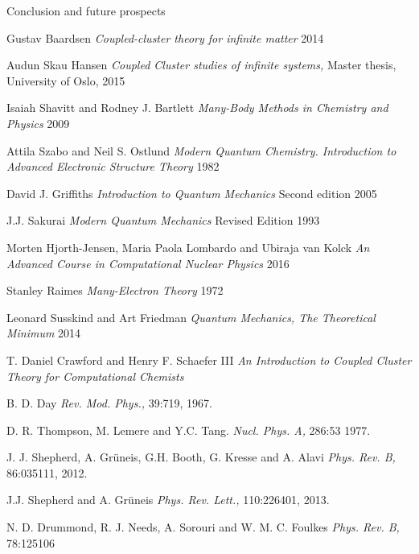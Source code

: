 \documentclass[twoside,english]{uiofysmaster}
\begin{document}
\begin{chapter}{Conclusion and future prospects}
	
\end{chapter}


\medskip


\begin{thebibliography}{9}

	Gustav Baardsen
	\textit{Coupled-cluster theory for infinite matter} 2014

	Audun Skau Hansen
	\textit{Coupled Cluster studies of infinite systems,} Master thesis, University of Oslo, 2015

	Isaiah Shavitt and Rodney J. Bartlett
	\textit{Many-Body Methods in Chemistry and Physics} 2009

	Attila Szabo and Neil S. Ostlund
	\textit{Modern Quantum Chemistry. Introduction to Advanced Electronic Structure Theory} 1982

	David J. Griffiths
	\textit{Introduction to Quantum Mechanics} Second edition 2005

	J.J. Sakurai
	\textit{Modern Quantum Mechanics} Revised Edition 1993

	Morten Hjorth-Jensen, Maria Paola Lombardo and Ubiraja van Kolck
	\textit{An Advanced Course in Computational Nuclear Physics} 2016

	Stanley Raimes
	\textit{Many-Electron Theory} 1972

	Leonard Susskind and Art Friedman
	\textit{Quantum Mechanics, The Theoretical Minimum} 2014

	T. Daniel Crawford and Henry F. Schaefer III
	\textit{An Introduction to Coupled Cluster Theory for Computational Chemists} 

	B. D. Day
	\textit{Rev. Mod. Phys.,}
	39:719, 1967.

	D. R. Thompson, M. Lemere and Y.C. Tang.
	\textit{Nucl. Phys. A,} 286:53 1977.

	J. J. Shepherd, A. Grüneis, G.H. Booth, G. Kresse and A. Alavi 
	\textit{Phys. Rev. B,} 86:035111, 2012.

	J.J. Shepherd and A. Grüneis
	\textit{Phys. Rev. Lett.,} 110:226401, 2013.

	N. D. Drummond, R. J. Needs, A. Sorouri and W. M. C. Foulkes
	\textit{Phys. Rev. B,} 78:125106


\end{thebibliography}
\end{document}
